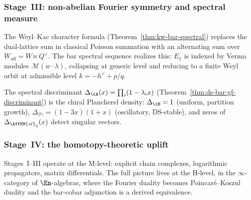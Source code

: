 \subsubsection{Stage~III: non-abelian Fourier symmetry and spectral
  measure}

\begin{remark}
\label{rem:weyl-nonabelian-fourier}
The Weyl--Kac character formula (Theorem~\ref{thm:kw-bar-spectral}) replaces the dual-lattice sum in classical Poisson summation with an alternating sum over $W_{\mathrm{aff}} = W \ltimes Q^\vee$.  The bar spectral sequence realizes this: $E_1$ is indexed by Verma modules $\mathcal{M}(w \cdot \lambda)$, collapsing at generic level and reducing to a finite Weyl orbit at admissible level $k = -h^\vee + p/q$.
\end{remark}

\begin{remark}
\label{rem:spectral-plancherel}
The spectral discriminant $\Delta_\cA(x) = \prod_i (1 - \lambda_i x)$ (Theorem~\ref{thm:ds-bar-gf-discriminant}) is the chiral Plancherel density: $\Delta_\cH = 1$ (uniform, partition growth), $\Delta_{\beta\gamma} = (1 - 3x)(1 + x)$ (oscillatory, DS-stable), and zeros of $\Delta_{\AffKM{sl}_2}(x)$ detect singular vectors.
\end{remark}

\subsubsection{Stage~IV: the homotopy-theoretic uplift}

Stages~I--III operate at the M-level: explicit chain complexes,
logarithmic propagators, matrix differentials.  The full picture
lives at the H-level, in the $\infty$-category of $\En$-algebras,
where the Fourier duality becomes Poincar\'e--Koszul duality and the
bar-cobar adjunction is a derived equivalence.

